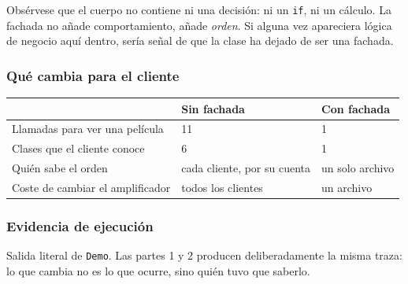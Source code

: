 Obsérvese que el cuerpo no contiene ni una decisión: ni un \texttt{if}, ni un cálculo. La
fachada no añade comportamiento, añade \emph{orden}. Si alguna vez apareciera lógica de
negocio aquí dentro, sería señal de que la clase ha dejado de ser una fachada.

\subsubsection*{Qué cambia para el cliente}

\begin{table}[h!]
    \centering
    \small
    \begin{tabular}{p{4.6cm}p{4.6cm}p{4.6cm}}
        \toprule
        & \textbf{Sin fachada} & \textbf{Con fachada} \\
        \midrule
        Llamadas para ver una película & 11 & 1 \\
        \addlinespace
        Clases que el cliente conoce & 6 & 1 \\
        \addlinespace
        Quién sabe el orden & cada cliente, por su cuenta & un solo archivo \\
        \addlinespace
        Coste de cambiar el amplificador & todos los clientes & un archivo \\
        \bottomrule
    \end{tabular}
\end{table}

\subsubsection*{Evidencia de ejecución}

Salida literal de \texttt{Demo}. Las partes 1 y 2 producen deliberadamente la misma traza: lo
que cambia no es lo que ocurre, sino quién tuvo que saberlo.

